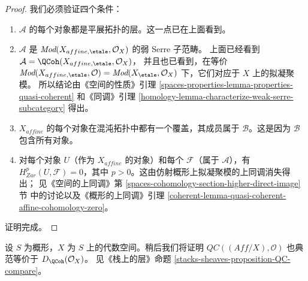 \begin{proof}
\medskip\noindent
我们必须验证四个条件：
\begin{enumerate}
\item $\mathcal{A}$ 的每个对象都是平展拓扑的层。这一点已在上面看到。
\item $\mathcal{A}$ 是
$\textit{Mod}(X_{affine, \etale}, \mathcal{O}_X)$ 的弱 Serre 子范畴。
上面已经看到
$\mathcal{A} = \QCoh(X_{affine, \etale}, \mathcal{O}_X)$，
并且也已看到，在等价
$\textit{Mod}(X_{affine, \etale}, \mathcal{O}) =
\textit{Mod}(X_\etale, \mathcal{O}_X)$ 下，它们对应于 $X$ 上的拟凝聚模。
所以结论由《空间的性质》引理
\ref{spaces-properties-lemma-properties-quasi-coherent} 和《同调》引理
\ref{homology-lemma-characterize-weak-serre-subcategory} 得出。%
\item $X_{affine}$ 的每个对象在混沌拓扑中都有一个覆盖，其成员属于
$\mathcal{B}$。这是因为 $\mathcal{B}$ 包含所有对象。
\item 对每个对象 $U$（作为 $X_{affine}$ 的对象）和每个
$\mathcal{F}$（属于 $\mathcal{A}$），有
$H^p_{Zar}(U, \mathcal{F}) = 0$，其中 $p > 0$。这由仿射概形上拟凝聚模的上同调消失得出；
见《空间的上同调》第 \ref{spaces-cohomology-section-higher-direct-image} 节
中的讨论以及《概形的上同调》引理
\ref{coherent-lemma-quasi-coherent-affine-cohomology-zero}。
\end{enumerate}
证明完成。
\end{proof}

\begin{remark}
\label{remark-QC-compare}
设 $S$ 为概形，$X$ 为 $S$ 上的代数空间。稍后我们将证明
$\mathit{QC}((\textit{Aff}/X), \mathcal{O})$
也典范等价于 $D_\QCoh(\mathcal{O}_X)$。
见《栈上的层》命题 \ref{stacks-sheaves-proposition-QC-compare}。
\end{remark}













